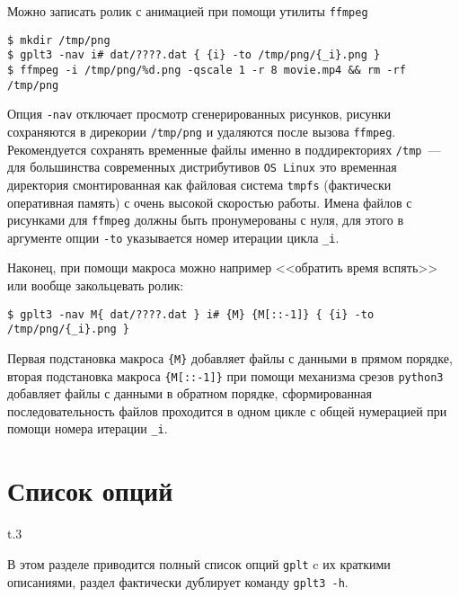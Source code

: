 \documentclass[12pt]{article}
\def\gplt{{\tt gplt}}
\def\python{{\tt python3}}
\begin{document}
Можно записать ролик с анимацией при помощи утилиты \verb'ffmpeg' 
\begin{verbatim}
$ mkdir /tmp/png
$ gplt3 -nav i# dat/????.dat { {i} -to /tmp/png/{_i}.png }
$ ffmpeg -i /tmp/png/%d.png -qscale 1 -r 8 movie.mp4 && rm -rf /tmp/png
\end{verbatim}
Опция \verb'-nav' отключает просмотр сгенерированных рисунков, рисунки сохраняются в дирекории \verb'/tmp/png' и удаляются после вызова \verb'ffmpeg'.
Рекомендуется сохранять временные файлы именно в поддиректориях \verb'/tmp'~--- для большинства современных дистрибутивов \verb'OS Linux'
это временная директория смонтированная как файловая система \verb'tmpfs' (фактически оперативная память) с очень высокой скоростью работы.  
Имена файлов с рисунками для \verb'ffmpeg' должны быть пронумерованы с нуля, для этого в аргументе опции \verb'-to' указывается
номер итерации цикла \verb'_i'.

Наконец, при помощи макроса можно например <<обратить время вспять>> или вообще закольцевать ролик:
\begin{verbatim}
$ gplt3 -nav M{ dat/????.dat } i# {M} {M[::-1]} { {i} -to /tmp/png/{_i}.png }
\end{verbatim}
Первая подстановка макроса \verb'{M}' добавляет файлы с данными в прямом порядке, вторая подстановка  макроса \verb'{M[::-1]}'
при помощи механизма срезов \python{} добавляет файлы с данными в обратном порядке, сформированная последовательность файлов проходится в одном цикле
с общей нумерацией при помощи номера итерации \verb'_i'.


\section{Список опций}
\begin{wrapfigure}[2]{t}{.3\textwidth}
  \vphantom{.}
  \vspace{-3cm}

\end{wrapfigure}
В этом разделе приводится полный список опций \gplt{} c их краткими описаниями, раздел фактически  дублирует команду \verb'gplt3 -h'.
\end{document}
